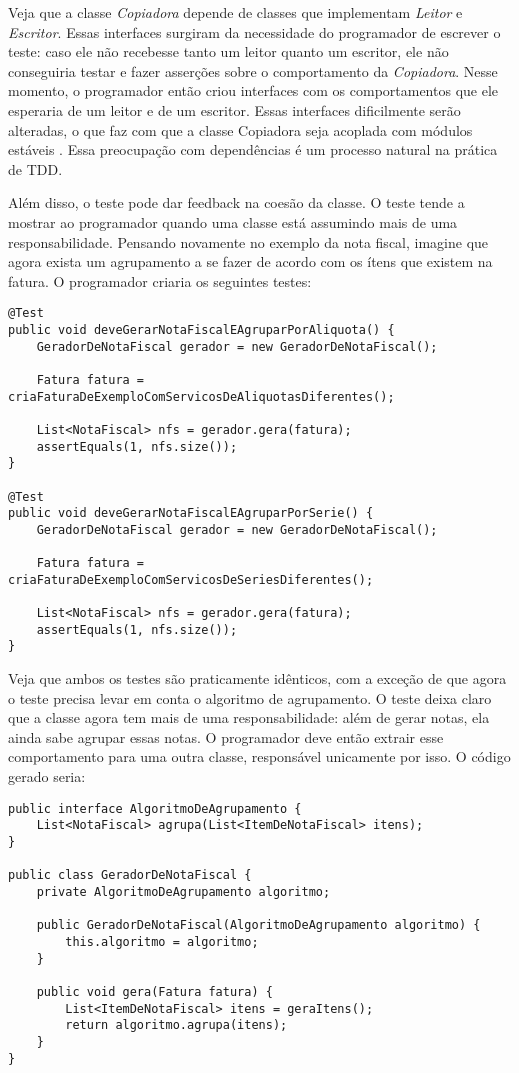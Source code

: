 Veja que a classe \textit{Copiadora} depende de classes que implementam \textit{Leitor} e \textit{Escritor}. Essas interfaces
surgiram da necessidade do programador de escrever o teste: caso ele não recebesse tanto um leitor quanto um escritor, ele não
conseguiria testar e fazer asserções sobre o comportamento da \textit{Copiadora}. Nesse momento, o programador então criou interfaces
com os comportamentos que ele esperaria de um leitor e de um escritor. Essas interfaces dificilmente serão alteradas, o que faz com que
a classe Copiadora seja acoplada com módulos estáveis \cite{bob-martin}. Essa preocupação com dependências é um processo natural na prática de TDD.

Além disso, o teste pode dar feedback na coesão da classe. O teste tende a mostrar ao programador quando uma classe está assumindo mais
de uma responsabilidade. Pensando novamente no exemplo da nota fiscal, imagine que agora exista um agrupamento a se fazer de acordo com os 
ítens que existem na fatura. O programador criaria os seguintes testes:

\begin{lstlisting}[frame=trbl]
@Test
public void deveGerarNotaFiscalEAgruparPorAliquota() {
	GeradorDeNotaFiscal gerador = new GeradorDeNotaFiscal();
	
	Fatura fatura = criaFaturaDeExemploComServicosDeAliquotasDiferentes();
	
	List<NotaFiscal> nfs = gerador.gera(fatura);
	assertEquals(1, nfs.size());
}

@Test
public void deveGerarNotaFiscalEAgruparPorSerie() {
	GeradorDeNotaFiscal gerador = new GeradorDeNotaFiscal();
	
	Fatura fatura = criaFaturaDeExemploComServicosDeSeriesDiferentes();
	
	List<NotaFiscal> nfs = gerador.gera(fatura);
	assertEquals(1, nfs.size());
}
\end{lstlisting}

Veja que ambos os testes são praticamente idênticos, com a exceção de que agora o teste precisa levar em conta o algoritmo de agrupamento. 
O teste deixa claro que a classe agora tem mais de uma responsabilidade: além de gerar notas, ela ainda sabe agrupar essas notas. O programador
deve então extrair esse comportamento para uma outra classe, responsável unicamente por isso. O código gerado seria:

\begin{lstlisting}[frame=trbl]
public interface AlgoritmoDeAgrupamento {
	List<NotaFiscal> agrupa(List<ItemDeNotaFiscal> itens);
}

public class GeradorDeNotaFiscal {
	private AlgoritmoDeAgrupamento algoritmo;
	
	public GeradorDeNotaFiscal(AlgoritmoDeAgrupamento algoritmo) {
		this.algoritmo = algoritmo;
	}
	
	public void gera(Fatura fatura) {
		List<ItemDeNotaFiscal> itens = geraItens();
		return algoritmo.agrupa(itens);
	}
}
\end{lstlisting}

